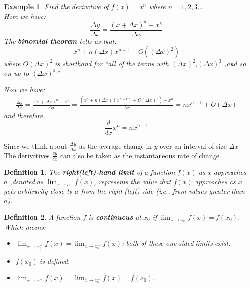 \documentclass[10pt, a4paper]{article}
\newtheorem{definition}{Definition}
\newtheorem{example}{Example}
\begin{document}
\begin{example}
    Find the derivative of $f(x)=x^n$ where $n=1,2,3\dots$ \\
    Here we have:
    \[
        \frac{\Delta y}{\Delta x}=\frac{(x+\Delta x)^n-x^n}{\Delta x}
    \]
    The \textbf{binomial theorem} tells us that:
    \[
        x^n+n(\Delta x)x^{n-1}+O\left((\Delta x)^2\right)
    \]
    where $O(\Delta x)^2$ is shorthand for 
    ``all of the terms with $(\Delta x)^2$,$(\Delta x)^3$
    ,and so on up to $(\Delta x)^n$''

    Now we have:
    \[
    \begin{aligned}
        \frac{\Delta y}{\Delta x}=\frac{(x+\Delta x)^n-x^n}{\Delta x}=\frac{(x^n+n(\Delta x)(x^{n-1})+O(\Delta x)^2)-x^n}{\Delta x}=nx^{n-1}+O(\Delta x)
    \end{aligned}
    \]
    and therefore,
    \[
        \frac{d}{dx}x^n = nx^{n-1}
    \]
\end{example}

Since we think about $\frac{\Delta y}{\Delta x}$ as the average change in $y$ over an interval of size $\Delta x$
The derivatives $\frac{dy}{dx}$ can also be taken as the instantaneous rate of change.


\begin{definition}
    The \textbf{right(left)-hand limit} of a function \(f(x)\) as \(x\) approaches \(a\)
    ,denoted as \(\lim_{{x \to a^+}} f(x)\), represents the value that \(f(x)\) approaches 
    as \(x\) gets arbitrarily close to \(a\) from the right (left) side 
    (i.e., from values greater than \(a\)).
\end{definition}

\begin{definition}
    A function $f$ is \textbf{continuous} at $x_0$ if \(\lim_{{x \to x_0}} f(x) = f(x_0)\). Which means:
    \begin{itemize}[label=$\ast$]  
        \item $\lim_{x\to x_0^+}f(x)=\lim_{x\to x_0^-}f(x)$; both of these one sided limits exist.
        \item $f(x_0)$ is defined.
        \item $\lim_{x\to x_0^+}f(x)=\lim_{x\to x_0^-}f(x)=f(x_0).$
    \end{itemize}

\end{definition}
\end{document}
